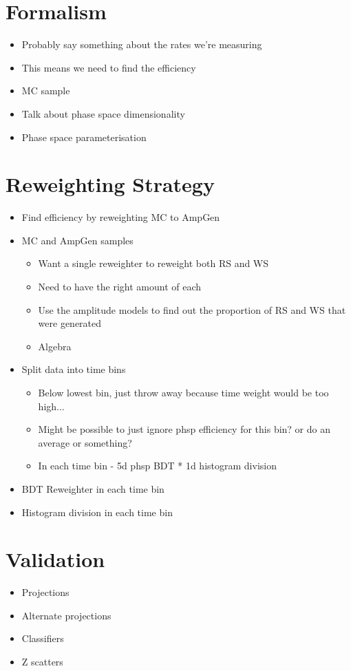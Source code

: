 \documentclass[note.tex]{subfiles}
\begin{document}
\section{Formalism}
\begin{itemize}
    \item Probably say something about the rates we're measuring
    \item This means we need to find the efficiency
    \item MC sample
    \item Talk about phase space dimensionality
    \item Phase space parameterisation
\end{itemize}

\section{Reweighting Strategy}
\begin{itemize}
    \item Find efficiency by reweighting MC to AmpGen
    \item MC and AmpGen samples
          \begin{itemize}
              \item Want a single reweighter to reweight both RS and WS
              \item Need to have the right amount of each
              \item Use the amplitude models to find out the proportion of RS and WS that were generated
              \item Algebra
          \end{itemize}
    \item Split data into time bins
          \begin{itemize}
              \item Below lowest bin, just throw away because time weight would be too high...
              \item Might be possible to just ignore phsp efficiency for this bin? or do an average or something?
              \item In each time bin - 5d phsp BDT * 1d histogram division
          \end{itemize}
    \item BDT Reweighter in each time bin
    \item Histogram division in each time bin
\end{itemize}

\section{Validation}
\begin{itemize}
    \item Projections
    \item Alternate projections
    \item Classifiers
    \item Z scatters
\end{itemize}
\end{document}
